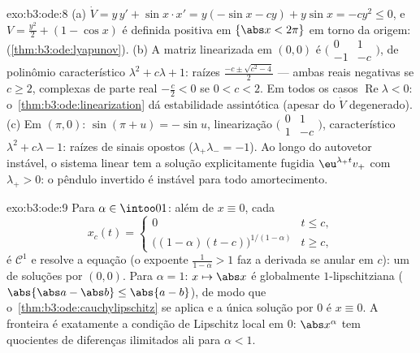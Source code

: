 \begin{solution}{exo:b3:ode:8}
(a) $\dot V = y\,y' + \sin x\cdot x' = y(-\sin x - cy) +
y\sin x = -cy^2 \leq 0$, e $V = \frac{y^2}2 + (1 - \cos x)$
é definida positiva em $\{\abs x < 2\pi\}$ em torno da
origem:  (\cref{thm:b3:ode:lyapunov}).
(b) A matriz linearizada em $(0,0)$ é
$\bigl(\begin{smallmatrix}0 & 1\\ -1 &
-c\end{smallmatrix}\bigr)$, de polinômio característico
$\lambda^2 + c\lambda + 1$: raízes $\frac{-c \pm \sqrt{c^2 -
4}}2$ --- ambas reais negativas se $c \geq 2$, complexas de parte
real $-\frac c2 < 0$ se $0 < c < 2$. Em todos os casos
$\operatorname{Re}\lambda < 0$:
o~\cref{thm:b3:ode:linearization} dá estabilidade assintótica
(apesar do $\dot V$ degenerado).
(c) Em $(\pi, 0)$: $\sin(\pi + u) = -\sin u$, linearização
$\bigl(\begin{smallmatrix}0&1\\1&-c\end{smallmatrix}\bigr)$,
característico $\lambda^2 + c\lambda - 1$: raízes de sinais
opostos ($\lambda_+\lambda_- = -1$). Ao longo do autovetor
instável, o sistema linear tem a solução explicitamente fugidia
$\eu^{\lambda_+t}v_+$ com $\lambda_+ > 0$: o
pêndulo invertido é instável para todo amortecimento.
\end{solution}

\begin{solution}{exo:b3:ode:9}
Para $\alpha \in \intoo01$: além de $x \equiv 0$, cada
\[
x_c(t) = \begin{cases}0 & t \leq c,\\
\bigl((1-\alpha)(t - c)\bigr)^{1/(1-\alpha)} & t \geq c,
\end{cases}
\]
é $\mathcal C^1$ e resolve a equação (o expoente
$\frac1{1-\alpha} > 1$ faz a derivada se anular em $c$): um
 de soluções por $(0,0)$. Para $\alpha = 1$: $x
\mapsto \abs x$ é globalmente $1$-lipschitziana
($\abs{\abs a - \abs b} \leq \abs{a - b}$), de modo que
o~\cref{thm:b3:ode:cauchylipschitz} se aplica e a única
solução por $0$ é $x \equiv 0$. A fronteira é exatamente
a condição de Lipschitz local em $0$: $\abs x^\alpha$ tem
quocientes de diferenças ilimitados ali para $\alpha < 1$.
\end{solution}

